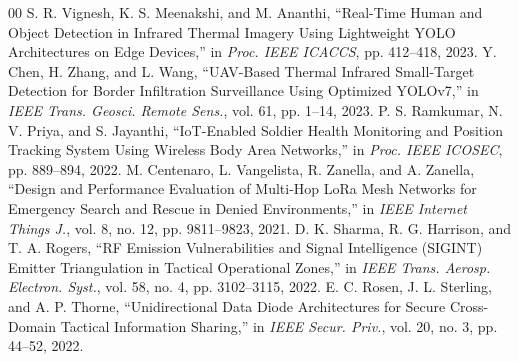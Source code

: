 \documentclass[conference]{IEEEtran}
\begin{document}
\begin{thebibliography}{00}
 S. R. Vignesh, K. S. Meenakshi, and M. Ananthi, ``Real-Time Human and Object Detection in Infrared Thermal Imagery Using Lightweight YOLO Architectures on Edge Devices,'' in \textit{Proc. IEEE ICACCS}, pp. 412--418, 2023.
 Y. Chen, H. Zhang, and L. Wang, ``UAV-Based Thermal Infrared Small-Target Detection for Border Infiltration Surveillance Using Optimized YOLOv7,'' in \textit{IEEE Trans. Geosci. Remote Sens.}, vol. 61, pp. 1--14, 2023.
 P. S. Ramkumar, N. V. Priya, and S. Jayanthi, ``IoT-Enabled Soldier Health Monitoring and Position Tracking System Using Wireless Body Area Networks,'' in \textit{Proc. IEEE ICOSEC}, pp. 889--894, 2022.
 M. Centenaro, L. Vangelista, R. Zanella, and A. Zanella, ``Design and Performance Evaluation of Multi-Hop LoRa Mesh Networks for Emergency Search and Rescue in Denied Environments,'' in \textit{IEEE Internet Things J.}, vol. 8, no. 12, pp. 9811--9823, 2021.
 D. K. Sharma, R. G. Harrison, and T. A. Rogers, ``RF Emission Vulnerabilities and Signal Intelligence (SIGINT) Emitter Triangulation in Tactical Operational Zones,'' in \textit{IEEE Trans. Aerosp. Electron. Syst.}, vol. 58, no. 4, pp. 3102--3115, 2022.
 E. C. Rosen, J. L. Sterling, and A. P. Thorne, ``Unidirectional Data Diode Architectures for Secure Cross-Domain Tactical Information Sharing,'' in \textit{IEEE Secur. Priv.}, vol. 20, no. 3, pp. 44--52, 2022.
\end{thebibliography}
\end{document}
